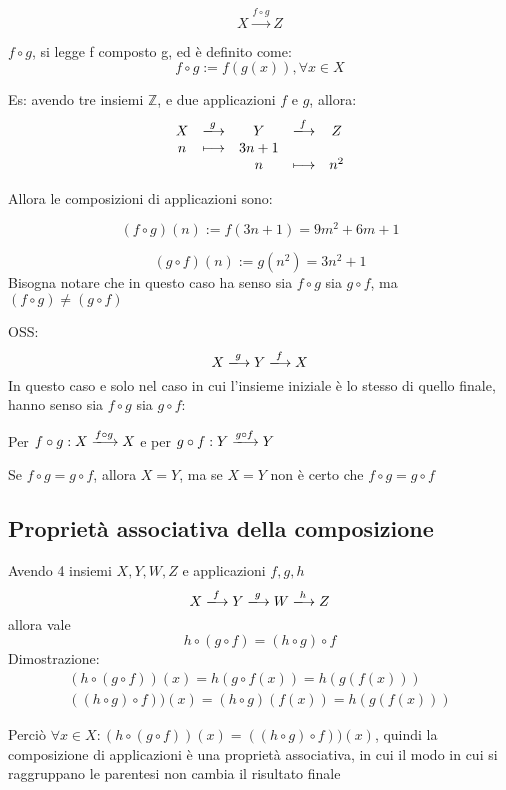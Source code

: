 \documentclass[a4paper,12pt]{article}
\begin{document}
	\[
	X \xrightarrow{f \circ g} Z
	\]
	
	$f \circ g$, si legge f composto g, ed è definito come:
	\[
	f \circ g := f(g(x)), \forall x\in X
	\]
	
	Es: avendo tre insiemi $\mathbb{Z}$, e due applicazioni $f$ e $g$, allora:
	\[
	\begin{array}{c c c c c}
		X & \xlongrightarrow{g} & Y & \xlongrightarrow{f} & Z \\
		n & \longmapsto & 3n+1 & & \\
		&& n & \longmapsto & n^2
	\end{array}
	\]
	
	Allora le composizioni di applicazioni sono:
	
	\[
	(f \circ g)(n) := f(3n + 1) = 9m^2 + 6m + 1
	\]	
	
	\[
	(g \circ f)(n) := g(n^2) = 3n^2 + 1
	\]
	Bisogna notare che in questo caso ha senso sia $f \circ g$ sia $g \circ f$, ma $(f \circ g) \not = (g \circ f)$
	
	
	OSS: 
	\[
	X \xlongrightarrow{g} Y \xlongrightarrow{f} X
	\]
	In questo caso e solo nel caso in cui l'insieme iniziale è lo stesso di quello finale, hanno senso sia $f \circ g$ sia $g \circ f$:
	\begin{center}
		Per $f \circ g : X \xlongrightarrow{f \circ g} X$ e per $g \circ f : Y \xlongrightarrow{g \circ f} Y$
	\end{center}
	Se $f \circ g = g \circ f$, allora $X = Y$, ma se $X = Y$ non è certo che $f \circ g = g \circ f$
	
	\subsection{Proprietà associativa della composizione}
	
	Avendo 4 insiemi $X, Y, W, Z$ e applicazioni $f, g, h$
	\[
	X \xlongrightarrow{f} Y \xlongrightarrow{g} W \xlongrightarrow{h} Z
	\]
	allora vale
	\[
	h \circ (g \circ f) = (h \circ g) \circ f
	\]
	Dimostrazione:
	\begin{align}
		(h \circ (g \circ f))(x) = h(g \circ f(x)) = h(g(f(x))) \\
		((h \circ g) \circ f))(x) = (h \circ g)(f(x)) = h(g(f(x)))
	\end{align}
	
	Perciò $\forall x \in X: (h \circ (g \circ f))(x) = ((h \circ g) \circ f))(x)$, quindi la composizione di applicazioni è una proprietà associativa, in cui il modo in cui si raggruppano le parentesi non cambia il risultato finale
	
\end{document}
